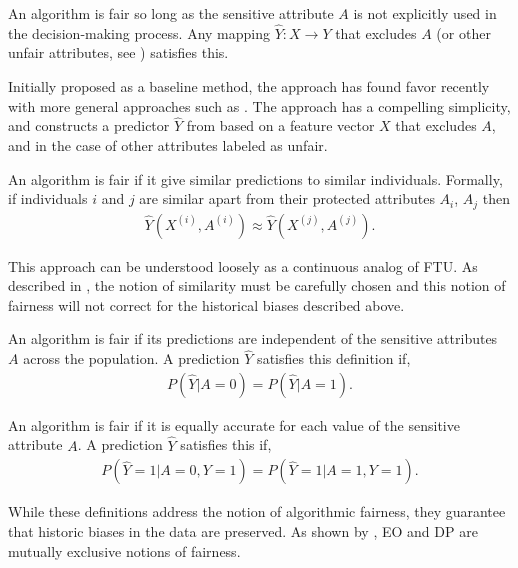 \begin{define}
  An algorithm is fair so long as the sensitive attribute $A$ is not
  explicitly used in the decision-making process. Any mapping
  $\hat{Y}: X \rightarrow Y$ that excludes $A$ (or other unfair
    attributes, see \citet{grgiccase}) satisfies this.
\end{define}
Initially proposed as a baseline method, the approach has found favor
recently with more general approaches such as \cite{grgiccase}.  The
approach has a compelling simplicity, and constructs a
predictor $\hat Y$ from based on a feature vector $X$ that excludes
$A$, and in the case of \cite{grgiccase} other attributes
labeled as unfair.
%
\begin{define}
  An algorithm is fair if it give similar predictions to similar
  individuals. Formally, if individuals $i$ and $j$ are similar apart
  from their protected attributes $A_i$, $A_j$ then
\begin{align}
  \hat{Y}(X^{(i)}, A^{(i)}) \approx \hat{Y}(X^{(j)}, A^{(j)}).\nonumber
\end{align}
\end{define}
This approach can be understood loosely as a continuous analog of
FTU. As described in \cite{dwork2012fairness}, the
notion of similarity must be carefully chosen and this notion of fairness
will not correct for the historical biases described above.
%
\begin{define}
  An algorithm is fair if its predictions are independent of the
  sensitive attributes $A$ across the population. A prediction
  $\hat{Y}$ satisfies this definition if,
\begin{align}
P(\hat{Y} | A = 0) = P(\hat{Y} | A = 1). \nonumber
\end{align}
\end{define}
%
\begin{define}
An algorithm is fair if it is equally accurate for each value of the sensitive attribute $A$. A prediction $\hat{Y}$ satisfies this if,
\begin{align}
P(\hat{Y}=1 | A=0,Y=1) = P(\hat{Y}=1 | A=1,Y=1). \nonumber
\end{align}
\end{define}
While these definitions address the notion of algorithmic fairness, they guarantee that historic biases in the data are preserved. As shown by \citet{kleinberg2016inherent}, EO and DP are mutually exclusive notions of fairness.

